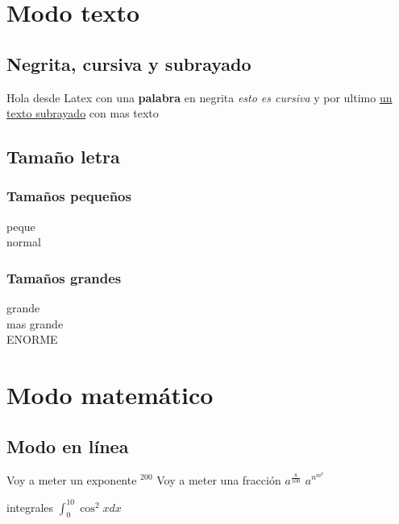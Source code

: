 \documentclass[10pt, a4paper]{report}
\begin{document}
\pagebreak
\tableofcontents
\pagebreak

\chapter{Modo texto}

\section{Negrita, cursiva y subrayado}

Hola desde Latex con
una {\bf palabra} en negrita
{\it esto es cursiva} y
por ultimo
\underline {un texto subrayado} con mas texto

\section{Tamaño letra}

\subsection{Tamaños pequeños}
{\tiny peque \\}
{\normalsize normal \\}
\subsection{Tamaños grandes}
{\large grande \\}
{\LARGE mas grande \\}
{\Huge ENORME \\}

\chapter{Modo matemático}

\section{Modo en línea}

Voy a meter un exponente $^{200} $
Voy a meter una fracción $ a^{\frac{8}{100}} $
$ a^{n^{m^{p}}} $

integrales $ \int_{0}^{10} \cos^2 x dx $
\end{document}
